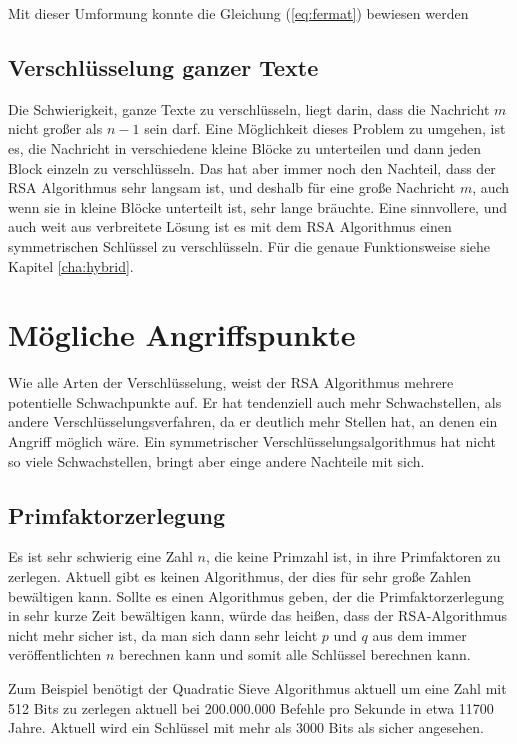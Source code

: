\documentclass[12pt,a4paper]{scrartcl}
\begin{document}
	Mit dieser Umformung konnte die Gleichung (\ref{eq:fermat}) bewiesen werden 
	
	\subsection{Verschlüsselung ganzer Texte}
		\label{cha:hole_text}

	Die Schwierigkeit, ganze Texte zu verschlüsseln, liegt darin, dass die Nachricht $m$ nicht großer als $n - 1$ sein darf. Eine Möglichkeit dieses Problem zu umgehen, ist es, die Nachricht in verschiedene kleine Blöcke zu unterteilen und dann jeden Block einzeln zu verschlüsseln. Das hat aber immer noch den Nachteil, dass der RSA Algorithmus sehr langsam ist, und deshalb für eine große Nachricht $m$, auch wenn sie in kleine Blöcke unterteilt ist, sehr lange bräuchte. Eine sinnvollere, und auch weit aus verbreitete Lösung ist es mit dem RSA Algorithmus einen symmetrischen Schlüssel zu verschlüsseln. Für die genaue Funktionsweise siehe Kapitel \ref{cha:hybrid}.


\section{Mögliche Angriffspunkte}
Wie alle Arten der Verschlüsselung, weist der RSA Algorithmus mehrere potentielle Schwachpunkte auf. Er hat tendenziell auch mehr Schwachstellen, als andere Verschlüsselungsverfahren, da er deutlich mehr Stellen hat, an denen ein Angriff möglich wäre. Ein symmetrischer Verschlüsselungsalgorithmus hat nicht so viele Schwachstellen, bringt aber einge andere Nachteile mit sich.
	\subsection{Primfaktorzerlegung}
	\label{cha:primfaktorzerlegung}
	Es ist sehr schwierig eine Zahl $n$, die keine Primzahl ist, in ihre Primfaktoren zu zerlegen. Aktuell gibt es keinen Algorithmus, der dies für sehr große Zahlen bewältigen kann. Sollte es einen Algorithmus geben, der die Primfaktorzerlegung in sehr kurze Zeit bewältigen kann, würde das heißen, dass der RSA-Algorithmus nicht mehr sicher ist, da man sich dann sehr leicht $p$ und $q$ aus dem immer veröffentlichten $n$ berechnen kann und somit alle Schlüssel berechnen kann.
	
	Zum Beispiel benötigt der Quadratic Sieve Algorithmus aktuell um eine Zahl mit 512 Bits zu zerlegen aktuell bei 200.000.000 Befehle pro Sekunde in etwa 11700 Jahre. \cite[S.115]{Beutelspacher2015-jl}
	Aktuell wird ein Schlüssel mit mehr als 3000 Bits als sicher angesehen. \cite[29]{bsireco}
	 
\end{document}
